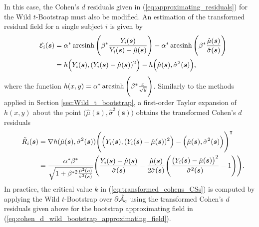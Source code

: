 In this case, the Cohen's $d$ residuals given in (\ref{eq:approximating_residuals}) for the Wild $t$-Bootstrap must also be modified. An estimation of the transformed residual field for a single subject $i$ is given by 
\begin{alignat}{4}
\label{eq:single_subject_transformed_residuals}
&&\mathcal{E}_{i}(\bm{s})
& = \alpha^{*} \operatorname{arcsinh}\Bigg(\beta^{*} \frac{Y_{i}(\bm{s})}{Y_{i}(\bm{s}) - \hat{\mu}(\bm{s})} \Bigg) - \alpha^{*} \operatorname{arcsinh}\Bigg(\beta^{*} \frac{\hat{\mu}(\bm{s})}{\hat{\sigma}(\bm{s})} \Bigg)\notag\\
&
&
&= h\Big(Y_{i}(\bm{s}),(Y_{i}(\bm{s}) - \hat{\mu}(\bm{s}))^{2}\Big) - h\Big(\hat{\mu}(\bm{s}), \hat{\sigma}^{2}(\bm{s})\Big),
\end{alignat}
where the function $h(x,y) =  \alpha^{*} \operatorname{arcsinh}\Bigg(\beta^{*} \frac{x}{\sqrt{y}}\Bigg)$. Similarly to the methods applied in Section \ref{sec:Wild_t_bootstrap}, a first-order Taylor expansion of $h(x,y)$ about the point $\Big(\hat{\mu}(\bm{s}), \hat{\sigma}^{2}(\bm{s})\Big)$ obtains the transformed Cohen's $d$ residuals
\begin{alignat}{4}
\label{eq:transformed_approximating_residuals}
&&\tilde{R}_{i}(\bm{s})
&= \nabla h(\hat{\mu}(\bm{s}),\hat{\sigma}^{2}(\bm{s}))\Bigg( \Big(Y_{i}(\bm{s}),(Y_{i}(\bm{s}) - \hat{\mu}(\bm{s}))^{2}\Big) - \Big(\hat{\mu}(\bm{s}), \hat{\sigma}^{2}(\bm{s}) \Big) \Bigg)^{\intercal}\notag\\
&
&
&= \frac{\alpha^{*}\beta^{*}}{\sqrt{1 + \beta^{*2}\frac{\hat{\mu}^{2}(\bm{s})}{\hat{\sigma}^{2}(\bm{s})}}} \Bigg(\frac{Y_{i}(\bm{s}) - \hat{\mu}(\bm{s})}{\hat{\sigma}(\bm{s})} - \frac{\hat{\mu}(\bm{s})}{2\hat{\sigma}(\bm{s})}\Bigg( \frac{\big(Y_{i}(\bm{s}) - \hat{\mu}(\bm{s})\big)^{2}}{\hat{\sigma}^{2}(\bm{s})} - 1 \Bigg)\Bigg).
\end{alignat}
In practice, the critical value $k$ in (\ref{eq:transformed_cohens_CSs}) is computed by applying the Wild $t$-Bootstrap over $\operatorname{\partial\hat{\mathcal{A}}_{c}}$ using the transformed Cohen's $d$ residuals given above for the bootstrap approximating field in (\ref{eq:cohen_d_wild_bootstrap_approximating_field}).

